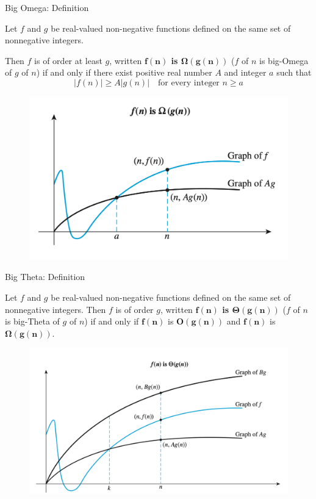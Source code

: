 \documentclass[10pt]{beamer}
\begin{document}
\begin{frame}{Big Omega: Definition}
\small 
\begin{mygreenbox}[title=Definition]
Let $f$ and $g$ be real-valued non-negative functions defined on the same set of nonnegative integers. 

\vfill 

Then $f$ is of order at least $g$, written \textbf{$\bm{f(n)}$ is $\bm{\Omega(g(n))}$} ($f$ of $n$ is big-Omega of $g$ of $n$) if and only if there exist positive real number $A$ and integer $a$ such that
\[  |f(n)| \geq A |g(n)| \quad \text{for every integer } n \geq a\]	
\end{mygreenbox}
\vfill 
\begin{figure}
\includegraphics[width=.6\textwidth]{images/big_Omega.png}
\end{figure}
\end{frame}


\begin{frame}{Big Theta: Definition}

\begin{mygreenbox}[title=Definition]
Let $f$ and $g$ be real-valued non-negative functions defined on the same set of nonnegative integers. 
\vfill 
Then $f$ is of order $g$, written \textbf{$\bm{f(n)}$ is $\bm{\Theta(g(n))}$} ($f$ of $n$ is big-Theta of $g$ of $n$) if and only if $\bm{f(n)}$ is $\bm{O(g(n))}$ and $\bm{f(n)}$ is $\bm{\Omega(g(n))}$.
\end{mygreenbox}

\vfill 
\begin{figure}
\includegraphics[width=.6\textwidth]{images/big_Theta_solo.png}
\end{figure}

\end{frame}
\end{document}
